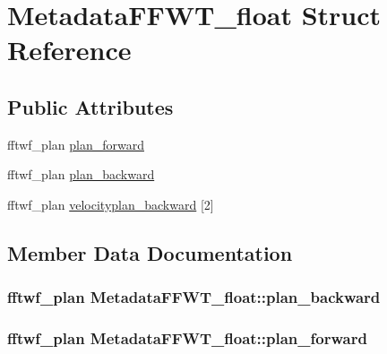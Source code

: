 \hypertarget{struct_metadata_f_f_w_t__float}{}\section{Metadata\+F\+F\+W\+T\+\_\+float Struct Reference}
\label{struct_metadata_f_f_w_t__float}
\subsection*{Public Attributes}
\begin{DoxyCompactItemize}
\item 
fftwf\+\_\+plan \hyperlink{struct_metadata_f_f_w_t__float_a6ec926ae25318030bb47518beeefba3f}{plan\+\_\+forward}
\item 
fftwf\+\_\+plan \hyperlink{struct_metadata_f_f_w_t__float_a23850732001eb66ee76603a9c00bf74f}{plan\+\_\+backward}
\item 
fftwf\+\_\+plan \hyperlink{struct_metadata_f_f_w_t__float_a9e2ff4e1a4bbf29bcfd38c908b615ed5}{velocityplan\+\_\+backward} \mbox{[}2\mbox{]}
\end{DoxyCompactItemize}


\subsection{Member Data Documentation}
\hypertarget{struct_metadata_f_f_w_t__float_a23850732001eb66ee76603a9c00bf74f}{}
\subsubsection[{plan\+\_\+backward}]{\setlength{\rightskip}{0pt plus 5cm}fftwf\+\_\+plan Metadata\+F\+F\+W\+T\+\_\+float\+::plan\+\_\+backward}\label{struct_metadata_f_f_w_t__float_a23850732001eb66ee76603a9c00bf74f}
\hypertarget{struct_metadata_f_f_w_t__float_a6ec926ae25318030bb47518beeefba3f}{}
\subsubsection[{plan\+\_\+forward}]{\setlength{\rightskip}{0pt plus 5cm}fftwf\+\_\+plan Metadata\+F\+F\+W\+T\+\_\+float\+::plan\+\_\+forward}\label{struct_metadata_f_f_w_t__float_a6ec926ae25318030bb47518beeefba3f}
\hypertarget{struct_metadata_f_f_w_t__float_a9e2ff4e1a4bbf29bcfd38c908b615ed5}{}
